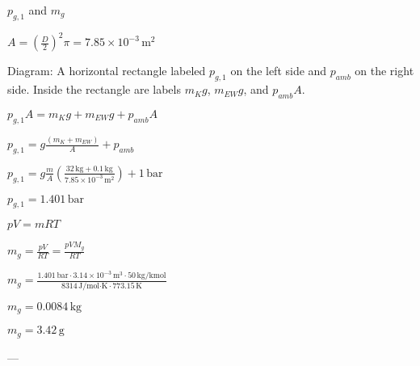\( p_{g,1} \) and \( m_g \)  

\( A = \left( \frac{D}{2} \right)^2 \pi = 7.85 \times 10^{-3} \, \text{m}^2 \)  

Diagram: A horizontal rectangle labeled \( p_{g,1} \) on the left side and \( p_{amb} \) on the right side. Inside the rectangle are labels \( m_K g \), \( m_{EW} g \), and \( p_{amb} A \).  

\( p_{g,1} A = m_K g + m_{EW} g + p_{amb} A \)  

\( p_{g,1} = g \frac{(m_K + m_{EW})}{A} + p_{amb} \)  

\( p_{g,1} = g \frac{m}{A} \left( \frac{32 \, \text{kg} + 0.1 \, \text{kg}}{7.85 \times 10^{-3} \, \text{m}^2} \right) + 1 \, \text{bar} \)  

\( p_{g,1} = 1.401 \, \text{bar} \)  

\( p V = m R T \)  

\( m_g = \frac{p V}{R T} = \frac{p V M_g}{R T} \)  

\( m_g = \frac{1.401 \, \text{bar} \cdot 3.14 \times 10^{-3} \, \text{m}^3 \cdot 50 \, \text{kg/kmol}}{8314 \, \text{J/mol·K} \cdot 773.15 \, \text{K}} \)  

\( m_g = 0.0084 \, \text{kg} \)  

\( m_g = 3.42 \, \text{g} \)  

---